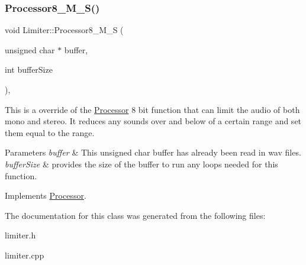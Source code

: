 \subsubsection{\texorpdfstring{Processor8\+\_\+\+M\+\_\+\+S()}{Processor8\_M\_S()}}
{\footnotesize\ttfamily void Limiter\+::\+Processor8\+\_\+\+M\+\_\+S (\begin{DoxyParamCaption}\item[{unsigned char $\ast$}]{buffer,  }\item[{int}]{buffer\+Size }\end{DoxyParamCaption})\hspace{0.3cm}{\ttfamily [override]}, {\ttfamily [virtual]}}



This is a override of the \hyperlink{classProcessor}{Processor} 8 bit function that can limit the audio of both mono and stereo. It reduces any sounds over and below of a certain range and set them equal to the range. 


\begin{DoxyParams}{Parameters}
{\em buffer} & This unsigned char buffer has already been read in wav files. \\
\hline
{\em buffer\+Size} & provides the size of the buffer to run any loops needed for this function. \\
\hline
\end{DoxyParams}


Implements \hyperlink{classProcessor_a5a977cc3596fdeac860d5e28a99806a1}{Processor}.



The documentation for this class was generated from the following files\+:\begin{DoxyCompactItemize}
\item 
limiter.\+h\item 
limiter.\+cpp\end{DoxyCompactItemize}
